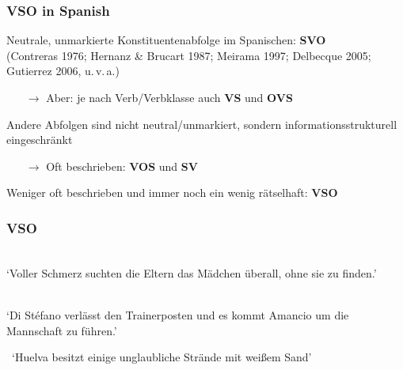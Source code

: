 \begin{frame}
  \frametitle{VSO in Spanish}

Neutrale, unmarkierte Konstituentenabfolge im Spanischen: \textbf{SVO}\\[.3ex]
{\footnotesize (Contreras 1976; Hernanz \& Brucart 1987;
  Meirama 1997; Delbecque 2005; Gutierrez 2006, u.\,v.\,a.)}

\pause

\begin{itemize}
  \item[$\rightarrow$] Aber: je nach Verb/Verbklasse auch \textbf{VS} und \textbf{OVS}
\end{itemize}

\vspace{.5cm}

\pause

Andere Abfolgen sind nicht neutral/unmarkiert, sondern informationsstrukturell eingeschränkt

\begin{itemize}
  \item[$\rightarrow$] Oft beschrieben: \textbf{VOS} und \textbf{SV}
\end{itemize}

\vspace{.5cm}
 
\pause

Weniger oft beschrieben und immer noch ein wenig rätselhaft: \textbf{VSO}




\end{frame}


\begin{frame}
  \frametitle{VSO}


\begin{exe}
  \\
    {\footnotesize `Voller Schmerz suchten die Eltern das Mädchen überall, ohne sie zu finden.'}

  \\
  {\footnotesize `Di Stéfano verlässt den Trainerposten und es kommt Amancio um die Mannschaft zu führen.'}
  
  \  
      {\footnotesize `Huelva besitzt einige unglaubliche Strände mit weißem Sand'}
\end{exe}
\end{frame}


